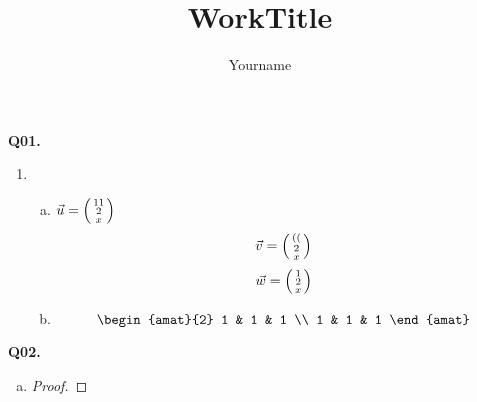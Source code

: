 \documentclass[11pt]{article}
\author{Yourname}
\title{WorkTitle}
\begin{document}
\setlength{\abovedisplayskip}{5pt}
\setlength{\belowdisplayskip}{5pt}
\parindent=0pt
\thispagestyle{firstpage}

\inserthead

\textbf{Q01.}

\begin{enumerate}
    \item \begin{enumerate}[(a), topsep=0pt]
            \item $\u = \ve{11, 2, x}$
                    $$\v = \ve{((, 2, x}$$
                    \[
                        \w = \ve{1, 2, x}
                    \]
            \item \[
                \begin{amat}{2}
                    1 & 1 & 1 \\
                    1 & 1 & 1
                \end{amat}
            \]
        \end{enumerate}
\end{enumerate}

\newpage

\textbf{Q02.}

\begin{enumerate}[(a)]
    \item \begin{proof}
        \end{proof}
\end{enumerate}
\end{document}
